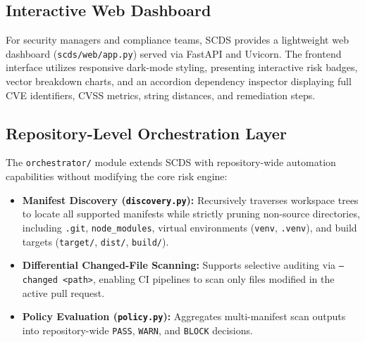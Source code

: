 \subsection{Interactive Web Dashboard}
For security managers and compliance teams, SCDS provides a lightweight web dashboard (\texttt{scds/web/app.py}) served via FastAPI and Uvicorn. The frontend interface utilizes responsive dark-mode styling, presenting interactive risk badges, vector breakdown charts, and an accordion dependency inspector displaying full CVE identifiers, CVSS metrics, string distances, and remediation steps.

\subsection{Repository-Level Orchestration Layer}
The \texttt{orchestrator/} module extends SCDS with repository-wide automation capabilities without modifying the core risk engine:
\begin{itemize}
    \item \textbf{Manifest Discovery (\texttt{discovery.py}):} Recursively traverses workspace trees to locate all supported manifests while strictly pruning non-source directories, including \texttt{.git}, \texttt{node\_modules}, virtual environments (\texttt{venv}, \texttt{.venv}), and build targets (\texttt{target/}, \texttt{dist/}, \texttt{build/}).
    \item \textbf{Differential Changed-File Scanning:} Supports selective auditing via \texttt{--changed <path>}, enabling CI pipelines to scan only files modified in the active pull request.
    \item \textbf{Policy Evaluation (\texttt{policy.py}):} Aggregates multi-manifest scan outputs into repository-wide \texttt{PASS}, \texttt{WARN}, and \texttt{BLOCK} decisions.
\end{itemize}
